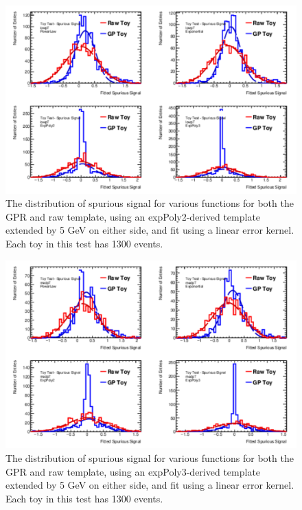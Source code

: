 \begin{figure} 
\begin{center}
  \includegraphics[width=\textwidth]{figures/background/gpr/validation/linear/ToyTest_FitSigVals_lowpT_1300_noSig}   
\caption{The distribution of spurious signal for various functions for both the GPR and raw template, using an expPoly2-derived template extended by 5 GeV on either side, and fit using a linear error kernel. Each toy in this test has 1300 events.}
\label{fig:linearkernel_lowpt_1300_noSig}
\end{center}
\end{figure}

\begin{figure} 
\begin{center}
  \includegraphics[width=\textwidth]{figures/background/gpr/validation/linear/ToyTest_FitSigVals_medpT_1300_noSig}   
\caption{The distribution of spurious signal for various functions for both the GPR and raw template, using an expPoly3-derived template extended by 5 GeV on either side, and fit using a linear error kernel. Each toy in this test has 1300 events.}
\label{fig:linearkernel_medpt_1300_noSig}
\end{center}
\end{figure}

